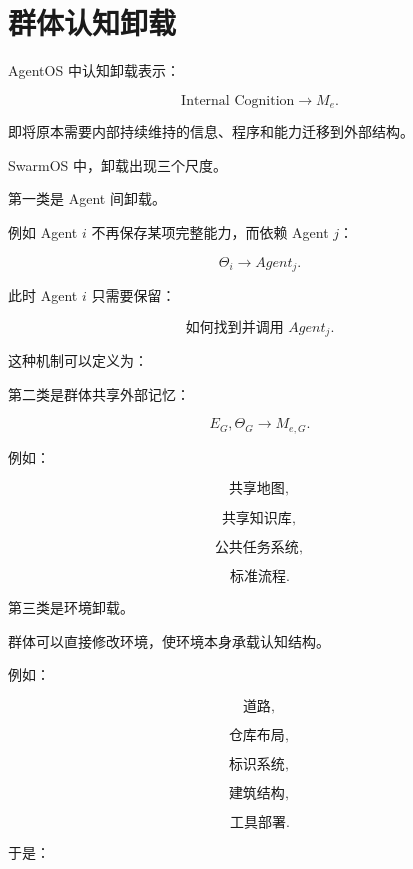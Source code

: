 \begin{statementbox}
\centering
{}
\end{statementbox}


\section{群体认知卸载}

AgentOS 中认知卸载表示：

\[
\text{Internal Cognition}
\rightarrow
M_e.
\]

即将原本需要内部持续维持的信息、程序和能力迁移到外部结构。

SwarmOS 中，卸载出现三个尺度。

第一类是 Agent 间卸载。

例如 Agent $i$ 不再保存某项完整能力，而依赖 Agent $j$：

\[
\Theta_i
\rightarrow
Agent_j.
\]

此时 Agent $i$ 只需要保留：

\[
\text{如何找到并调用 }Agent_j.
\]

这种机制可以定义为：

\begin{statementbox}
\centering
{}
\end{statementbox}

第二类是群体共享外部记忆：

\[
E_G,\Theta_G
\rightarrow
M_{e,G}.
\]

例如：

\[
\text{共享地图},
\]

\[
\text{共享知识库},
\]

\[
\text{公共任务系统},
\]

\[
\text{标准流程}.
\]

第三类是环境卸载。

群体可以直接修改环境，使环境本身承载认知结构。

例如：

\[
\text{道路},
\]

\[
\text{仓库布局},
\]

\[
\text{标识系统},
\]

\[
\text{建筑结构},
\]

\[
\text{工具部署}.
\]

于是：

\begin{statementbox}
\centering
{}
\end{statementbox}

